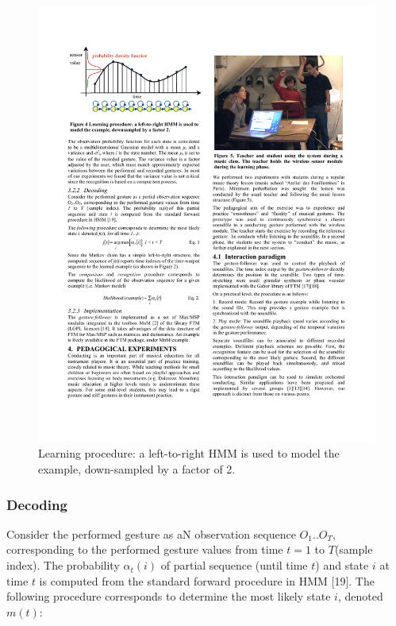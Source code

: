 \begin{figure}[t]
\centering
\includegraphics[scale=1.]{fig4.pdf}
%
%
\caption{Learning procedure: a left-to-right HMM is used to model the example, down-sampled by a factor of 2.}
\label{Bevilacqua:fig4}       %
\end{figure}

\subsubsection{Decoding}
Consider the performed gesture as aN observation sequence $O_1..O_T$, corresponding to the performed gesture values from time $t = 1$ to $T $(sample index). The probability $\alpha_t(i)$ of  partial sequence (until time $t$) and state $i$ at time $t$ is computed from the standard forward procedure in HMM [19]. 
The following procedure corresponds to determine the most likely state $i$, denoted $m(t)$:%

